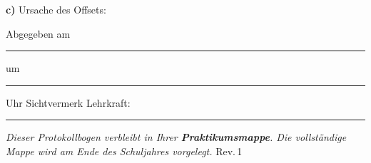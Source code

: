 \documentclass[11pt,a4paper]{scrartcl}
\begin{document}
	\vspace{0.7cm}
	
	\textbf{c)} Ursache des Offsets:
	
	\vspace{2cm}
	

	\vspace{0.4cm}
	\begin{tcolorbox}[colback=yellow!8, colframe=black, boxrule=0.6pt, title={\faIcon{check-circle}\enspace Abgabevermerk -- wird vor Ort ausgefüllt}, fonttitle=\bfseries]
		Abgegeben am \rule{2.8cm}{0.4pt} \enspace um \rule{2cm}{0.4pt} Uhr \hfill Sichtvermerk Lehrkraft: \rule{3.5cm}{0.4pt}

		\vspace{0.15cm}
		{\small\textit{Dieser Protokollbogen verbleibt in Ihrer \textbf{Praktikumsmappe}. Die vollständige Mappe wird am Ende des Schuljahres vorgelegt.} \hfill \scriptsize Rev.\,1}
	\end{tcolorbox}
\end{document}
